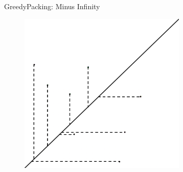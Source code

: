 \documentclass[11pt, british]{beamer}
\begin{document}
\begin{frame}{GreedyPacking: Minus Infinity}
  \begin{figure}
    \centering
    \includegraphics[width=8cm]{points minfinity.png}
  \end{figure}
\end{frame}
\end{document}
